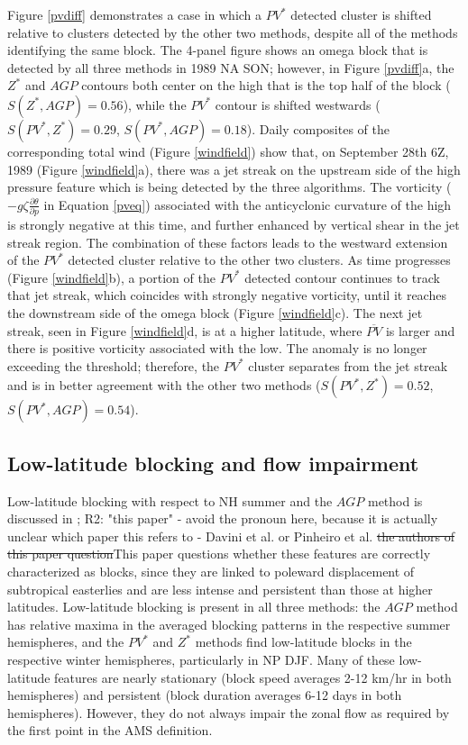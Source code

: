 \documentclass[smallextended]{svjour3}       %
\numberwithin{equation}{section}
\begin{document}
Figure \ref{pvdiff} demonstrates a case in which a $PV^*$ detected cluster is shifted relative to clusters detected by the other two methods, despite all of the methods identifying the same block. The 4-panel figure shows an omega block that is detected by all three methods in 1989 NA SON; however, in Figure \ref{pvdiff}a, the $Z^*$ and $AGP$ contours both center on the high that is the top half of the block ($S(Z^*, AGP)=0.56$), while the $PV^*$ contour is shifted westwards ($S(PV^*, Z^*)=0.29$, $S(PV^*, AGP)=0.18$). Daily composites of the corresponding total wind (Figure \ref{windfield}) show that, on September 28th 6Z, 1989 (Figure \ref{windfield}a), there was a jet streak on the upstream side of the high pressure feature which is being detected by the three algorithms. The vorticity ($-g\zeta \frac{\partial \theta}{\partial p}$ in Equation \ref{pveq}) associated with the anticyclonic curvature of the high is strongly negative at this time, and further enhanced by vertical shear in the jet streak region. The combination of these factors leads to the westward extension of the $PV^*$ detected cluster relative to the other two clusters. As time progresses (Figure \ref{windfield}b), a portion of the  $PV^*$ detected contour continues to track that jet streak, which coincides with strongly negative vorticity, until it reaches the downstream side of the omega block (Figure \ref{windfield}c). The next jet streak, seen in Figure \ref{windfield}d, is at a higher latitude, where $\overline{PV}$ is larger and there is positive vorticity associated with the low. The anomaly is no longer exceeding the threshold; therefore, the $PV^*$ cluster separates from the jet streak and is in better agreement with the other two methods ($S(PV^*, Z^*)=0.52$, $S(PV^*, AGP)=0.54$). 

\subsection{Low-latitude blocking and flow impairment}\label{lowlatsec}

Low-latitude blocking with respect to NH summer and the $AGP$ method is discussed in \citep{davini_bidimensional_2012};
{\color{teal}R2: "this paper" - avoid the pronoun here, because it is actually unclear which paper this refers to - Davini et al. or Pinheiro et al.}
{\color{blue}\sout{the authors of this paper question}This paper questions} whether these features are correctly characterized as blocks, since they are linked to poleward displacement of subtropical easterlies and are less intense and persistent than those at higher latitudes. Low-latitude blocking is present in all three methods: the $AGP$ method has relative maxima in the averaged blocking patterns in the respective summer hemispheres, and the $PV^*$ and $Z^*$ methods find low-latitude blocks in the respective winter hemispheres, particularly in NP DJF. Many of these low-latitude features are nearly stationary (block speed averages 2-12 km/hr in both hemispheres) and persistent (block duration averages 6-12 days in both hemispheres). However, they do not always impair the zonal flow as required by the first point in the AMS definition.
\end{document}

